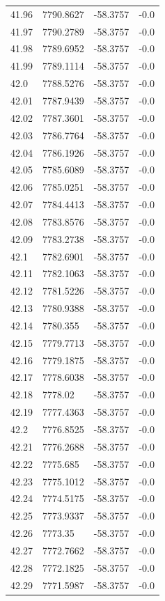 \begin{table}[H]
\begin{tabular}{llll}
41.96 & 7790.8627 & -58.3757 & -0.0 \\
41.97 & 7790.2789 & -58.3757 & -0.0 \\
41.98 & 7789.6952 & -58.3757 & -0.0 \\
41.99 & 7789.1114 & -58.3757 & -0.0 \\
42.0 & 7788.5276 & -58.3757 & -0.0 \\
42.01 & 7787.9439 & -58.3757 & -0.0 \\
42.02 & 7787.3601 & -58.3757 & -0.0 \\
42.03 & 7786.7764 & -58.3757 & -0.0 \\
42.04 & 7786.1926 & -58.3757 & -0.0 \\
42.05 & 7785.6089 & -58.3757 & -0.0 \\
42.06 & 7785.0251 & -58.3757 & -0.0 \\
42.07 & 7784.4413 & -58.3757 & -0.0 \\
42.08 & 7783.8576 & -58.3757 & -0.0 \\
42.09 & 7783.2738 & -58.3757 & -0.0 \\
42.1 & 7782.6901 & -58.3757 & -0.0 \\
42.11 & 7782.1063 & -58.3757 & -0.0 \\
42.12 & 7781.5226 & -58.3757 & -0.0 \\
42.13 & 7780.9388 & -58.3757 & -0.0 \\
42.14 & 7780.355 & -58.3757 & -0.0 \\
42.15 & 7779.7713 & -58.3757 & -0.0 \\
42.16 & 7779.1875 & -58.3757 & -0.0 \\
42.17 & 7778.6038 & -58.3757 & -0.0 \\
42.18 & 7778.02 & -58.3757 & -0.0 \\
42.19 & 7777.4363 & -58.3757 & -0.0 \\
42.2 & 7776.8525 & -58.3757 & -0.0 \\
42.21 & 7776.2688 & -58.3757 & -0.0 \\
42.22 & 7775.685 & -58.3757 & -0.0 \\
42.23 & 7775.1012 & -58.3757 & -0.0 \\
42.24 & 7774.5175 & -58.3757 & -0.0 \\
42.25 & 7773.9337 & -58.3757 & -0.0 \\
42.26 & 7773.35 & -58.3757 & -0.0 \\
42.27 & 7772.7662 & -58.3757 & -0.0 \\
42.28 & 7772.1825 & -58.3757 & -0.0 \\
42.29 & 7771.5987 & -58.3757 & -0.0 \\

\end{tabular}
\end{table}
